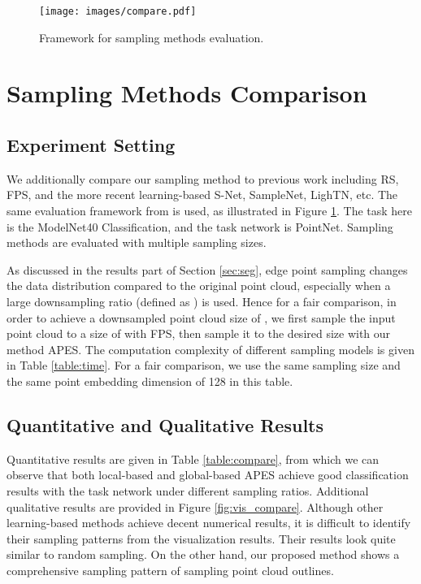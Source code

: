 \documentclass[10pt,twocolumn,letterpaper]{article}
\begin{document}
\begin{figure}[t]
    \centering
    \setlength{\abovecaptionskip}{2pt}
    \texttt{[image: images/compare.pdf]} 
    \caption{Framework for sampling methods evaluation.
    \vspace{-0.2cm}
    }
    \label{fig:compare}
\end{figure}


\section{Sampling Methods Comparison}
\label{sec:compare}
\subsection{Experiment Setting}
We additionally compare our sampling method to previous work including RS, FPS, and the more recent learning-based S-Net, SampleNet, LighTN, etc. The same evaluation framework from \cite{Dovrat2019LearningTS, Lang2020SampleNetDP, Wang2022LighTNLT} is used, as illustrated in Figure \ref{fig:compare}. The task here is the ModelNet40 Classification, and the task network is PointNet. 
Sampling methods are evaluated with multiple sampling sizes. 

As discussed in the results part of Section \ref{sec:seg}, edge point sampling changes the data distribution compared to the original point cloud, especially when a large downsampling ratio (defined as ) is used. 
Hence for a fair comparison, in order to achieve a downsampled point cloud size of , we first sample the input point cloud to a size of  with FPS, then sample it to the desired size  with our method APES.
The computation complexity of different sampling models is given in Table \ref{table:time}. For a fair comparison, we use the same sampling size  and the same point embedding dimension of 128 in this table.

\subsection{Quantitative and Qualitative Results}
Quantitative results are given in Table \ref{table:compare}, from which we can observe that both local-based and global-based APES achieve good classification results with the task network under different sampling ratios. Additional qualitative results are provided in Figure \ref{fig:vis_compare}. 
Although other learning-based methods achieve decent numerical results, it is difficult to identify their sampling patterns from the visualization results.
Their results look quite similar to random sampling. On the other hand, our proposed method shows a comprehensive sampling pattern of sampling point cloud outlines. 
\end{document}
